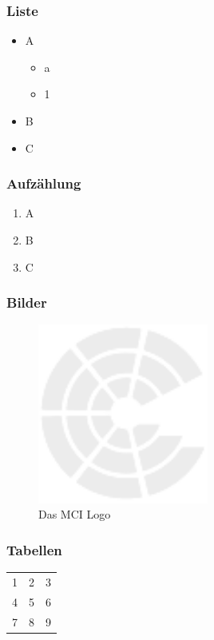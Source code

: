\documentclass[a4paper, ngerman, oneside, 10pt]{article}
\begin{document}
\subsubsection{Liste}
\begin{itemize}
	\item A
	      \begin{itemize}
		      \item a
		      \item 1
	      \end{itemize}
	\item B
	\item C
\end{itemize}

\subsubsection{Aufzählung}
\begin{enumerate}
	\item A
	\item B
	\item C
\end{enumerate}

\subsubsection{Bilder}
\begin{figure}[H]
	\centering
	\includegraphics[width=0.5\textwidth]{images/MCI_Logo.pdf}
	\caption{Das MCI Logo}
	\label{fig:mci_logo}
\end{figure}


\subsubsection{Tabellen}
\begin{tabular}{lcr}
	1 & 2 & 3 \\
	4 & 5 & 6 \\
	7 & 8 & 9 \\
\end{tabular}
\end{document}
